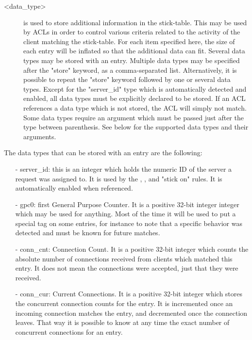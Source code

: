 {\begin{description}
   \item[<data\_type>] is used to store additional information in the stick-table. This
               may be used by ACLs in order to control various criteria related
               to the activity of the client matching the stick-table. For each
               item specified here, the size of each entry will be inflated so
               that the additional data can fit. Several data types may be
               stored with an entry. Multiple data types may be specified after
               the "store" keyword, as a comma-separated list. Alternatively,
               it is possible to repeat the "store" keyword followed by one or
               several data types. Except for the "server\_id" type which is
               automatically detected and enabled, all data types must be
               explicitly declared to be stored. If an ACL references a data
               type which is not stored, the ACL will simply not match. Some
               data types require an argument which must be passed just after
               the type between parenthesis. See below for the supported data
               types and their arguments.
  \end{description}

  The data types that can be stored with an entry are the following:
  \begin{itemize}
  \item[-] server\_id: this is an integer which holds the numeric ID of the server a
      request was assigned to. It is used by the , ,
      and "stick on" rules. It is automatically enabled when referenced.

  \item[-] gpc0: first General Purpose Counter. It is a positive 32-bit integer
      integer which may be used for anything. Most of the time it will be used
      to put a special tag on some entries, for instance to note that a
      specific behavior was detected and must be known for future matches.

  \item[-] conn\_cnt: Connection Count. It is a positive 32-bit integer which counts
      the absolute number of connections received from clients which matched
      this entry. It does not mean the connections were accepted, just that
      they were received.

  \item[-] conn\_cur: Current Connections. It is a positive 32-bit integer which
      stores the concurrent connection counts for the entry. It is incremented
      once an incoming connection matches the entry, and decremented once the
      connection leaves. That way it is possible to know at any time the exact
      number of concurrent connections for an entry.


\end{itemize}}
